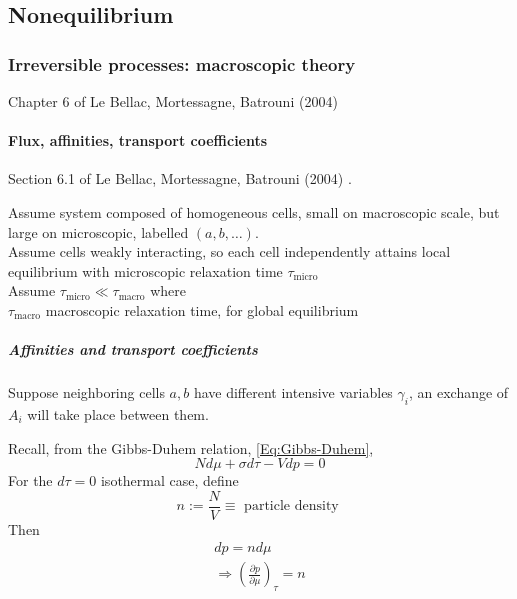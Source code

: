 \documentclass[10pt]{amsart}
\begin{document}
\begin{multicols*}{2}
\part{Nonequilibrium}

\section{Irreversible processes: macroscopic theory}

Chapter 6 of Le Bellac, Mortessagne, Batrouni (2004) \cite{MLeBellacFMortessagneGBatrouni2004}

\subsection{Flux, affinities, transport coefficients}

Section 6.1 of Le Bellac, Mortessagne, Batrouni (2004) \cite{MLeBellacFMortessagneGBatrouni2004}. 

Assume system composed of homogeneous cells, small on macroscopic scale, but large on microscopic, labelled $(a,b,\dots )$.  \\
Assume cells weakly interacting, so each cell independently attains local equilibrium with microscopic relaxation time $\tau_{\text{micro}}$ \\
Assume $\tau_{\text{micro}} \ll \tau_{\text{macro}}$ where \\
\phantom{Assume } $\tau_{\text{macro}}$ macroscopic relaxation time, for global equilibrium 










\subsubsection{Affinities and transport coefficients}

Suppose neighboring cells $a,b$ have different intensive variables $\gamma_i$, an exchange of $A_i$ will take place between them.








Recall, from the Gibbs-Duhem relation, \ref{Eq:Gibbs-Duhem},
\[
N d\mu + \sigma d\tau -Vdp = 0 
\]
For the $d\tau =0$ isothermal case, define
\begin{equation}
n := \frac{N}{V} \equiv \text{ particle density }
\end{equation}
Then 
\begin{equation}
\begin{gathered}
  dp = n d\mu \\ 
  \Longrightarrow \boxed{ \left( \frac{ \partial p }{ \partial \mu } \right)_{\tau} = n }
\end{gathered}
\end{equation}



\end{multicols*}
\end{document}
